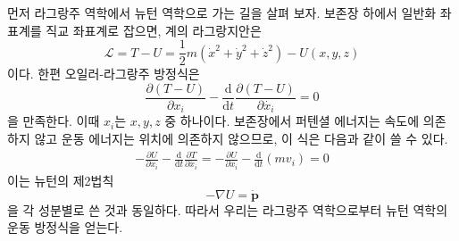\documentclass[chapter, oneside, b5paper]{oblivoir}
\theoremstyle{plain}
\theoremstyle{definition}
\theoremstyle{remark}
\begin{document}
먼저 라그랑주 역학에서 뉴턴 역학으로 가는 길을 살펴 보자. 보존장 하에서 일반화 좌표계를 직교 좌표계로 잡으면, 계의 라그랑지안은
\begin{equation}
    \mathcal{L} = T - U = \frac{1}{2}m(\dot{x}^2 + \dot{y}^2 + \dot{z}^2) - U(x, y, z)
\end{equation}
이다. 한편 오일러-라그랑주 방정식은
\begin{equation}
    \frac{\partial (T-U)}{\partial x_i} - \frac{\mathrm{d}}{\mathrm{d}t}\frac{\partial (T-U)}{\partial \dot{x_i}}= 0
\end{equation}
을 만족한다. 이때 $x_i$는 $x, y, z$ 중 하나이다. 보존장에서 퍼텐셜 에너지는 속도에 의존하지 않고 운동 에너지는 위치에 의존하지 않으므로, 이 식은 다음과 같이 쓸 수 있다.
\begin{equation}
    \begin{aligned}
        -\frac{\partial U}{\partial x_i} - \frac{\mathrm{d}}{\mathrm{d}t}\frac{\partial T}{\partial \dot{x_i}} = -\frac{\partial U}{\partial x_i} - \frac{\mathrm{d}}{\mathrm{d}t}(mv_i) =0
    \end{aligned}
\end{equation}
이는 뉴턴의 제2법칙
\begin{equation}
    -\nabla U = \mathbf{\dot{p}}
\end{equation}
을 각 성분별로 쓴 것과 동일하다. 따라서 우리는 라그랑주 역학으로부터 뉴턴 역학의 운동 방정식을 얻는다.
\end{document}
